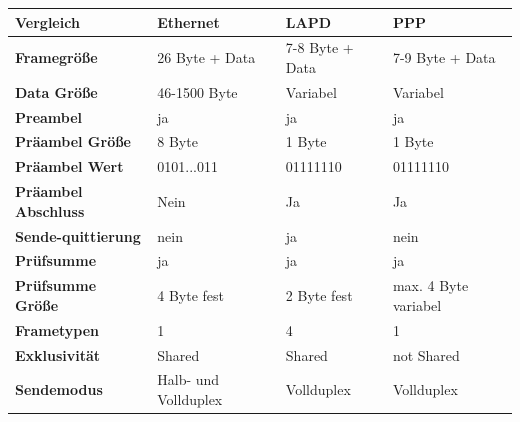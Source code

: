 \documentclass[12pt, a4paper, ngerman]{article}
\begin{document}
\begin{tabular}{| m{\dimexpr.2\linewidth} || m{\dimexpr.2\linewidth} | m{\dimexpr.2\linewidth} | m{\dimexpr.2\linewidth} |}
\hline
\textbf{Vergleich} & \textbf{Ethernet} & \textbf{LAPD} & \textbf{PPP} \\ \hline \hline

\textbf{Framegröße} & 26 Byte + Data & 7-8 Byte + Data & 7-9 Byte + Data \\ \hline

\textbf{Data Größe} & 46-1500 Byte & Variabel & Variabel \\ \hline

\textbf{Preambel} & ja & ja & ja\\ \hline

\textbf{Präambel Größe} & 8 Byte  & 1 Byte & 1 Byte\\ \hline

\textbf{Präambel Wert} & 0101...011  & 01111110 & 01111110\\ \hline

\textbf{Präambel Abschluss} & Nein & Ja & Ja\\ \hline

\textbf{Sende-quittierung} & nein & ja & nein\\ \hline
\textbf{Prüfsumme} & ja & ja & ja\\ \hline

\textbf{Prüfsumme Größe} & 4 Byte fest & 2 Byte fest & max. 4 Byte variabel \\ \hline

\textbf{Frametypen} & 1 & 4 &  1\\ \hline

\textbf{Exklusivität} & Shared & Shared & not Shared\\ \hline

\textbf{Sendemodus} & Halb- und Vollduplex & Vollduplex & Vollduplex \\ \hline
\end{tabular}


   
\nocite{*} 

\newpage
\sloppy
\printbibliography 



\newpage
\listoffigures
\end{document}
